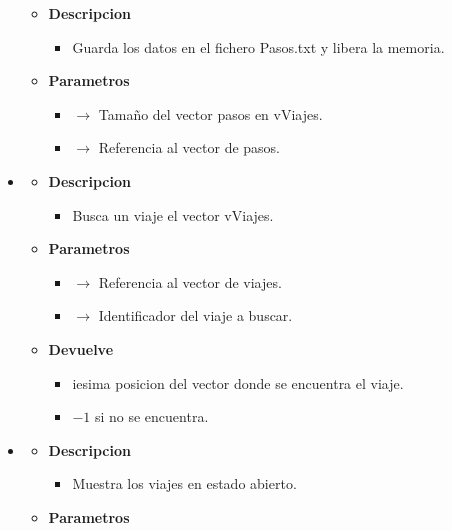 \begin{itemize}
\begin{itemize}
        \item \textbf{Descripcion}
        \begin{itemize}
			\item  Guarda los datos en el fichero Pasos.txt y libera la memoria.
		\end{itemize}
		\item \textbf{Parametros}
		\begin{itemize}
            \item {} $\rightarrow$ Tamaño del vector pasos en vViajes.
			\item {} $\rightarrow$ Referencia al vector de pasos.
		\end{itemize}
	\end{itemize}
    \newpage
    \item {}
    \begin{itemize}
        \item \textbf{Descripcion}
        \begin{itemize}
			\item  Busca un viaje el vector vViajes.
		\end{itemize}
		\item \textbf{Parametros}
		\begin{itemize}
			\item {} $\rightarrow$ Referencia al vector de viajes.
            \item {} $\rightarrow$ Identificador del viaje a buscar.
		\end{itemize}
        \item \textbf{Devuelve}
		\begin{itemize}
			\item iesima posicion del vector donde se encuentra el viaje.
            \item $-1$ si no se encuentra.
		\end{itemize}
	\end{itemize}
    \item{}
    \begin{itemize}
        \item \textbf{Descripcion}
        \begin{itemize}
			\item  Muestra los viajes en estado abierto.
		\end{itemize}
		\item \textbf{Parametros}
		\begin{itemize}

\end{itemize}
\end{itemize}
\end{itemize}
